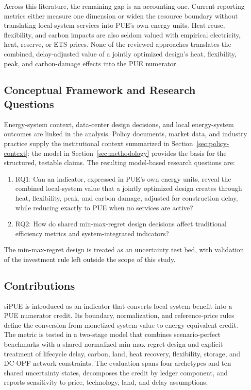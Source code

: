 \documentclass[preprint,12pt]{elsarticle}
\begin{document}
Across this literature, the remaining gap is an accounting one. Current reporting metrics either measure one dimension or widen the resource boundary without translating local-system services into PUE's own energy units. Heat reuse, flexibility, and carbon impacts are also seldom valued with empirical electricity, heat, reserve, or ETS prices. None of the reviewed approaches translates the combined, delay-adjusted value of a jointly optimized design's heat, flexibility, peak, and carbon-damage effects into the PUE numerator.

\subsection{Conceptual Framework and Research Questions}
Energy-system context, data-center design decisions, and local energy-system outcomes are linked in the analysis. Policy documents, market data, and industry practice supply the institutional context summarized in Section~\ref{sec:policy-context}; the model in Section~\ref{sec:methodology} provides the basis for the structured, testable claims. The resulting model-based research questions are:
\begin{enumerate}
\item RQ1: Can an indicator, expressed in PUE's own energy units, reveal the combined local-system value that a jointly optimized design creates through heat, flexibility, peak, and carbon damage, adjusted for construction delay, while reducing exactly to PUE when no services are active?
\item RQ2: How do shared min-max-regret design decisions affect traditional efficiency metrics and system-integrated indicators?
\end{enumerate}

The min-max-regret design is treated as an uncertainty test bed, with validation of the investment rule left outside the scope of this study.


\subsection{Contributions}
siPUE is introduced as an indicator that converts local-system benefit into a PUE numerator credit. Its boundary, normalization, and reference-price rules define the conversion from monetized system value to energy-equivalent credit. The metric is tested in a two-stage model that combines scenario-perfect benchmarks with a shared normalized min-max-regret design and explicit treatment of lifecycle delay, carbon, land, heat recovery, flexibility, storage, and DC-OPF network constraints. The evaluation spans four archetypes and ten shared uncertainty states, decomposes the credit by ledger component, and reports sensitivity to price, technology, land, and delay assumptions.
\end{document}
